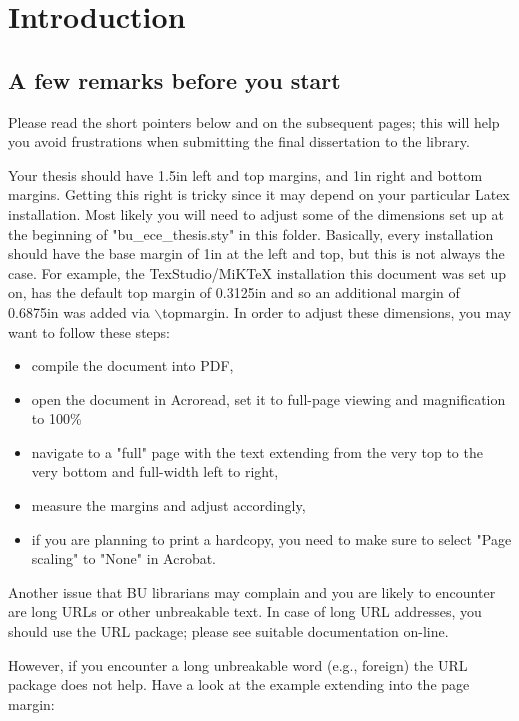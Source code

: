 \chapter{Introduction}
\label{chapter:Introduction}
\thispagestyle{myheadings}

\section{A few remarks before you start}
\label{sec:history}

Please read the short pointers below and on the subsequent pages; this will help
you avoid frustrations when submitting the final dissertation to the library.

Your thesis should have 1.5in left and top margins, and 1in right and bottom
margins. Getting this right is tricky since it may depend on your particular
Latex installation. Most likely you will need to adjust some of the dimensions
set up at the beginning of "bu\_ece\_thesis.sty" in this folder. Basically,
every installation should have the base margin of 1in at the left and top, but
this is not always the case. For example, the TexStudio/MiKTeX installation this
document was set up on, has the default top margin of 0.3125in and so an
additional margin of 0.6875in was added via $\backslash${topmargin}. In order to
adjust these dimensions, you may want to follow these steps:

\begin{itemize}
	\item compile the document into PDF,
	\item open the document in Acroread, set it to full-page viewing and
		magnification to 100\%
	\item navigate to a "full" page with the text extending from the very
		top to the very bottom and full-width left to right,
	\item measure the margins and adjust accordingly,
	\item if you are planning to print a hardcopy, you need to make sure
		to select "Page scaling" to "None" in Acrobat.
\end{itemize}

Another issue that BU librarians may complain and you are likely to encounter
are long URLs or other unbreakable text. In case of long URL addresses, you
should use the URL package; please see suitable documentation on-line.

However, if you encounter a long unbreakable word (e.g., foreign) the URL
package does not help. Have a look at the example extending into the page
margin:

